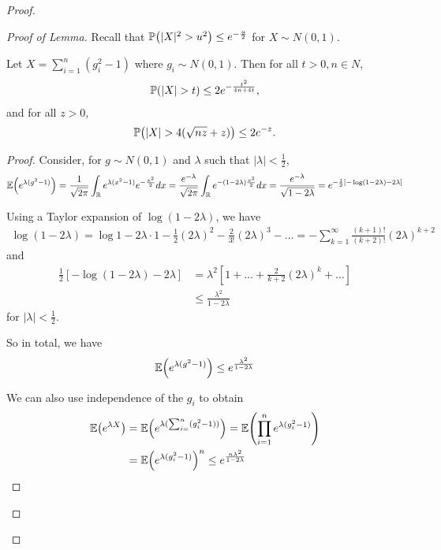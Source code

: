 \begin{proof}
\begin{proof}[Proof of Lemma]
    Recall that $\Prob{|X|^{2} > u^{2}} \leq e^{-\frac{u}{2}}$ for $X
    \sim N(0, 1)$.

    \begin{lem}
      Let $X = \sum_{i=1}^{n} (g_{i}^{2} - 1)$ where $g_{i} \sim N(0,
      1)$.  Then for all $t > 0, n \in N$,
      \begin{align}
        \label{eq:168}
        \Prob{|X| > t} \leq 2 e^{-\frac{t^{2}}{4n + 4t}}, 
      \end{align} and for all $z > 0$,
      \begin{align}
        \label{eq:169}
        \Prob{|X| > 4 (\sqrt{nz} + z)} \leq 2e^{-z}.
      \end{align}
    \end{lem}
    \begin{proof}
      Consider, for $g \sim N(0, 1)$ and $\lambda$ such that
      $|\lambda| < \frac{1}{2}$,
      \begin{align}
        \label{eq:170}
        \E{e^{\lambda(g^{2} - 1)}} = \frac{1}{\sqrt{2 \pi}} \int_{\R}
        e^{\lambda(x^{2} - 1)} e^{-\frac{x^{2}}{2}} dx =
        \frac{e^{-\lambda}}{\sqrt{2 \pi}} \int_{\R} e^{-(1- 2
          \lambda)\frac{x^{2}}{2}} dx = \frac{e^{-\lambda}}{\sqrt{1 -
            2 \lambda}} = e^{-\frac{1}{2}[-\log (1 - 2 \lambda) - 2 \lambda]}
      \end{align}

      Using a Taylor expansion of $\log (1 - 2 \lambda)$, we have
      \begin{align}
        \label{eq:171}
        \log (1 - 2 \lambda) = \log 1 - 2 \lambda \cdot 1 -
        \frac{1}{2}(2 \lambda)^{2} - \frac{2}{3!}(2 \lambda)^{3} - \dots
        = -\sum_{k=1}^{\infty} \frac{(k+1)!}{(k+2)!}(2 \lambda)^{k+2}
      \end{align} and
      \begin{align}
        \label{eq:172}
        \frac{1}{2}[-\log (1 - 2 \lambda) - 2 \lambda] &= \lambda^{2}[1
        + \dots + \frac{2}{k+2}(2 \lambda)^{k} + \dots] \\
        &\leq \frac{\lambda^{2}}{1 - 2 \lambda}
      \end{align} for $|\lambda| < \frac{1}{2}$.

      So in total, we have
      \begin{align}
        \label{eq:173}
        \E{e^{\lambda(g^{2} - 1)}} \leq e^{\frac{\lambda^{2}}{1 - 2 \lambda}}
      \end{align}

      We can also use independence of the $g_{i}$ to obtain
      \begin{align}
        \label{eq:174}
        \E{e^{\lambda X}} &= \E{e^{\lambda(\sum_{i=}^{n} (g_{i}^{2} -
            1))}} = \E{\prod_{i=1}^{n} e^{\lambda (g_{i}^{2} - 1)}} \\
        &= \E{e^{\lambda (g^{2}_{i} - 1)}}^{n} \leq e^{\frac{n
            \lambda^{2}}{1 - 2 \lambda}}
      \end{align}


\end{proof}
\end{proof}
\end{proof}
